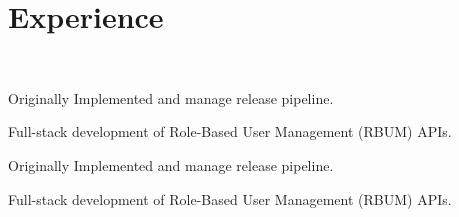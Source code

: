 \documentclass[]{csaund_resume-openfont}
\begin{document}
\hfill
\begin{minipage}[t]{0.66\textwidth}


\section{Experience}
 \\

\vspace{\topsep} %
\begin{tightemize}
\item Originally Implemented and manage release pipeline.
\item Full-stack development of Role-Based User Management (RBUM) APIs.
\end{tightemize}

\vspace{\topsep} %
\begin{tightemize}
\item Originally Implemented and manage release pipeline.
\item Full-stack development of Role-Based User Management (RBUM) APIs.
\end{tightemize}
\sectionsep


\end{minipage}
\end{document}
